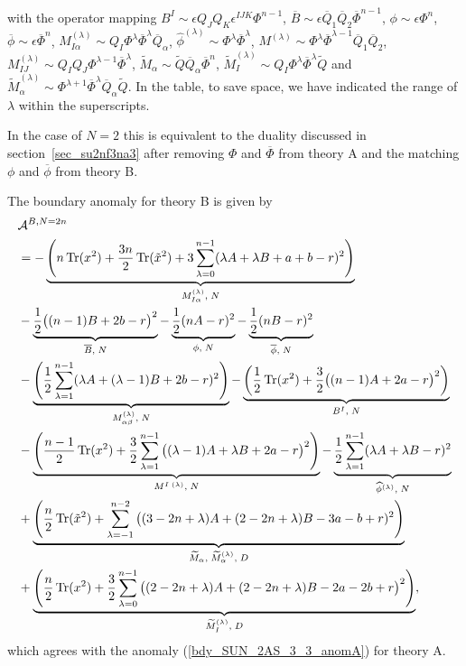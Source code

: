 \documentclass[12pt]{article}
\newcommand{\Acal}{\mathcal{A}}
\DeclareMathOperator*{\Tr}{{\rm Tr}}
\numberwithin{equation}{section}
\begin{document}
with the operator mapping $B^I \sim \epsilon Q_J Q_K \epsilon^{IJK} \Phi^{n-1}$, $\overline{B} \sim \epsilon \overline{Q}_1 \overline{Q}_2 \overline{\Phi}^{n-1}$, $\phi \sim \epsilon \Phi^n$, $\overline{\phi} \sim \epsilon \overline{\Phi}^n$, $M^{(\lambda)}_{I \alpha} \sim Q_I \Phi^\lambda \overline{\Phi}^\lambda \overline{Q}_{\alpha}$, $\widehat{\phi}^{(\lambda)} \sim \Phi^\lambda \overline{\Phi}^\lambda$, $M^{(\lambda)} \sim \Phi^\lambda \overline{\Phi}^{\lambda-1} \overline{Q}_1 \overline{Q}_2$, $M^{(\lambda)}_{IJ} \sim Q_I Q_J \Phi^{\lambda-1} \overline{\Phi}^\lambda$, $\widetilde{M}_{\alpha} \sim \widetilde{Q} \overline{Q}_{\alpha} \overline{\Phi}^n$, $\widetilde{M}^{(\lambda)}_I \sim Q_I \Phi^\lambda \overline{\Phi}^\lambda \widetilde{Q}$ and $\widetilde{M}^{(\lambda)}_{\alpha} \sim \Phi^{\lambda+1} \overline{\Phi}^\lambda \overline{Q}_{\alpha} \widetilde{Q}$. 
In the table, to save space, we have indicated the range of $\lambda$ within the superscripts.

In the case of $N=2$ this is equivalent to the duality discussed in section~\ref{sec_su2nf3na3} after removing $\Phi$ and $\overline{\Phi}$ from theory A and the matching $\phi$ and $\overline{\phi}$ from theory B.

The boundary anomaly for theory B is given by
\begin{align}
\label{bdy_SUN_2AS_3_3_anomB1}
&
\Acal^{B, N=2n}
\nonumber\\
&= - \underbrace{\left( n\Tr(x^2) + \frac{3n}{2} \Tr(\tilde{x}^2) + 3\sum_{\lambda = 0}^{n-1} (\lambda A + \lambda B + a + b - r)^2 \right)}_{M_{I \alpha}^{(\lambda)}, \; N}
\nonumber \\
 & - \underbrace{\frac{1}{2}\big( (n-1)B + 2b - r \big)^2}_{\overline{B}, \; N}
  - \underbrace{\frac{1}{2}(nA-r)^2}_{\phi, \; N}
  - \underbrace{\frac{1}{2}(nB-r)^2}_{\overline{\phi}, \; N}
  \nonumber \\
 & - \underbrace{\left( \frac{1}{2} \sum_{\lambda = 1}^{n-1} (\lambda A + (\lambda - 1)B + 2b - r)^2 \right)}_{M_{\alpha \beta}^{(\lambda)}, \; N}
  - \underbrace{\left( \frac{1}{2} \Tr(x^2) + \frac{3}{2}\big( (n-1)A + 2a-r \big)^2 \right)}_{B^I, \; N}
  \nonumber \\
  & - \underbrace{\left( \frac{n-1}{2} \Tr(x^2) + \frac{3}{2} \sum_{\lambda = 1}^{n-1} \big( (\lambda - 1)A + \lambda B + 2a - r \big)^2 \right)}_{M^{I \; (\lambda)}, \; N}
  - \underbrace{\frac{1}{2} \sum_{\lambda = 1}^{n-1} (\lambda A + \lambda B - r)^2}_{\widehat{\phi}^{(\lambda)}, \; N}
  \nonumber \\
 & + \underbrace{\left( \frac{n}{2} \Tr(\tilde{x}^2) + \sum_{\lambda = -1}^{n-2} \big( (3-2n+\lambda)A + (2-2n+\lambda)B - 3a - b + r)^2 \right)}_{\widetilde{M}_{\alpha}, \; \widetilde{M}_{\alpha}^{(\lambda)}, \; D}
  \nonumber \\
  & + \underbrace{\left( \frac{n}{2} \Tr(x^2) + \frac{3}{2} \sum_{\lambda = 0}^{n-1} \big( (2-2n+\lambda)A + (2-2n+\lambda)B - 2a - 2b + r \big)^2 \right)}_{\widetilde{M}_I^{(\lambda)}, \; D},
\end{align}
which agrees with the anomaly (\ref{bdy_SUN_2AS_3_3_anomA}) for theory A. 
\end{document}
